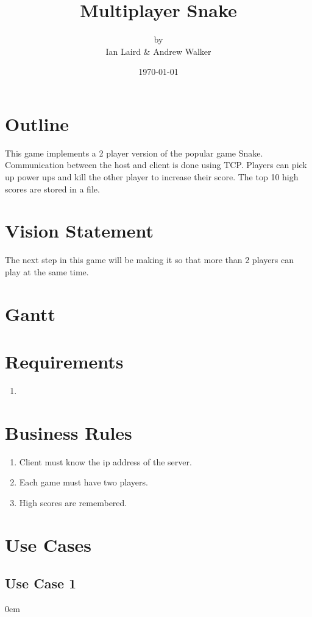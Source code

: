 \documentclass[titlepage]{article}
\title{{\Huge Multiplayer Snake}}
\date{\today}
\author{by\\{\large Ian Laird \& Andrew Walker}}
\begin{document}
	\maketitle
	\section{Outline}
	This game implements a 2 player version of the popular game Snake. Communication between the host and client is done using TCP. Players can pick up power ups and kill the other player to increase their score. The top 10 high scores are stored in a file.
	
	\section{Vision Statement}
	The next step in this game will be making it so that more than 2 players can play at the same time.
	
	\section{Gantt}
	
	\section{Requirements}
	\begin{enumerate}
		\item 
	\end{enumerate}
	
	\section{Business Rules}
	
	\begin{enumerate}
		\item Client must know the ip address of the server.
		\item Each game must have two players.
		\item High scores are remembered.
	\end{enumerate}
	
	\section{Use Cases}
	\subsection{Use Case 1}
	\itemsep0em 
\end{document}
